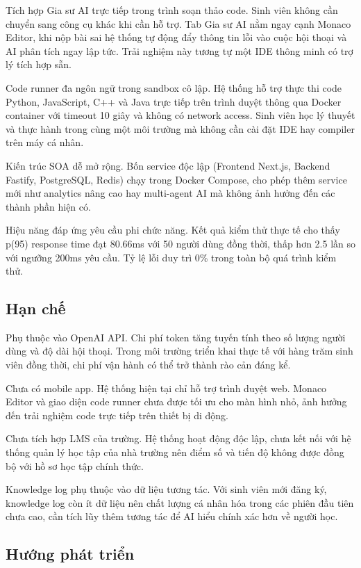 \documentclass[../main.tex]{subfiles}
\begin{document}
Tích hợp Gia sư AI trực tiếp trong trình soạn thảo code. Sinh viên không cần chuyển sang công cụ khác khi cần hỗ trợ. Tab Gia sư AI nằm ngay cạnh Monaco Editor, khi nộp bài sai hệ thống tự động đẩy thông tin lỗi vào cuộc hội thoại và AI phân tích ngay lập tức. Trải nghiệm này tương tự một IDE thông minh có trợ lý tích hợp sẵn.

Code runner đa ngôn ngữ trong sandbox cô lập. Hệ thống hỗ trợ thực thi code Python, JavaScript, C++ và Java trực tiếp trên trình duyệt thông qua Docker container với timeout 10 giây và không có network access. Sinh viên học lý thuyết và thực hành trong cùng một môi trường mà không cần cài đặt IDE hay compiler trên máy cá nhân.

Kiến trúc SOA dễ mở rộng. Bốn service độc lập (Frontend Next.js, Backend Fastify, PostgreSQL, Redis) chạy trong Docker Compose, cho phép thêm service mới như analytics nâng cao hay multi-agent AI mà không ảnh hưởng đến các thành phần hiện có.

Hiệu năng đáp ứng yêu cầu phi chức năng. Kết quả kiểm thử thực tế cho thấy p(95) response time đạt 80.66ms với 50 người dùng đồng thời, thấp hơn 2.5 lần so với ngưỡng 200ms yêu cầu. Tỷ lệ lỗi duy trì 0\% trong toàn bộ quá trình kiểm thử.

\subsection{Hạn chế}

Phụ thuộc vào OpenAI API. Chi phí token tăng tuyến tính theo số lượng người dùng và độ dài hội thoại. Trong môi trường triển khai thực tế với hàng trăm sinh viên đồng thời, chi phí vận hành có thể trở thành rào cản đáng kể.

Chưa có mobile app. Hệ thống hiện tại chỉ hỗ trợ trình duyệt web. Monaco Editor và giao diện code runner chưa được tối ưu cho màn hình nhỏ, ảnh hưởng đến trải nghiệm code trực tiếp trên thiết bị di động.

Chưa tích hợp LMS của trường. Hệ thống hoạt động độc lập, chưa kết nối với hệ thống quản lý học tập của nhà trường nên điểm số và tiến độ không được đồng bộ với hồ sơ học tập chính thức.

Knowledge log phụ thuộc vào dữ liệu tương tác. Với sinh viên mới đăng ký, knowledge log còn ít dữ liệu nên chất lượng cá nhân hóa trong các phiên đầu tiên chưa cao, cần tích lũy thêm tương tác để AI hiểu chính xác hơn về người học.

\subsection{Hướng phát triển}
\end{document}
